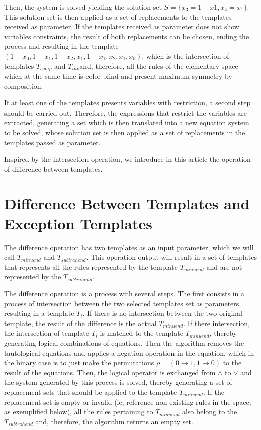 \documentclass{llncs}
\begin{document}
Then, the system is solved yielding the solution set $S = \{x_3 = 1-x1, x_4 = x_1\}$. This solution set is then applied as a set of replacements to the templates received as parameter. If the templates received as parameter does not show variables constraints, the result of both replacements can be chosen, ending the process and resulting in the template $(1 - x_0, 1 - x_1, 1 - x_2, x_1, 1 - x_1, x_2, x_1, x_0)$, which is the intersection of templates $T_{comp}$ and $T_{inv}$and, therefore, all the rules of the elementary space which at the same time is color blind and present maximum symmetry by composition.

If at least one of the templates presents variables with restriction, a second step should be carried out. Therefore, the expressions that restrict the variables are extracted, generating a set which is then translated into a new equation system to be solved, whose solution set is then applied as a set of replacements in the templates passed as parameter.

Inspired by the intersection operation, we introduce in this article the operation of difference between templates.

\section{Difference Between Templates and Exception Templates}
\label{sec:diferenca_entre_templates_e_templates_de_excecao}

The difference operation has two templates as an input parameter, which we will call $T_{minuend}$ and $T_{subtrahend}$. This operation output will result in a set of templates that represents all the rules represented by the template $T_{minuend}$ and are not represented by the $T_{subtrahend}$.

The difference operation is a process with several steps. The first consists in a process of intersection between the two selected templates set as parameters, resulting in a template $T_i$. If there is no intersection between the two original template, the result of the difference is the actual $T_{minuend}$. If there intersection, the intersection of template $T_i$ is matched to the template $T_{minuend}$, thereby generating logical combinations of equations. Then the algorithm removes the tautological equations and applies a negation operation in the equation, which in the binary case is to just make the permutations $\rho = (0 \to 1, 1 \to 0)$ to the result of the equations. Then, the logical operator is exchanged from $\wedge$ to $\vee$ and the system generated by this process is solved, thereby generating a set of replacement sets that should be applied to the template $T_{minuend}$. If the replacement set is empty or invalid (ie, reference non existing rules in the space, as exemplified below), all the rules pertaining to $T_{minuend}$ also belong to the $T_{subtrahend}$ and, therefore, the algorithm returns an empty set.
\end{document}
